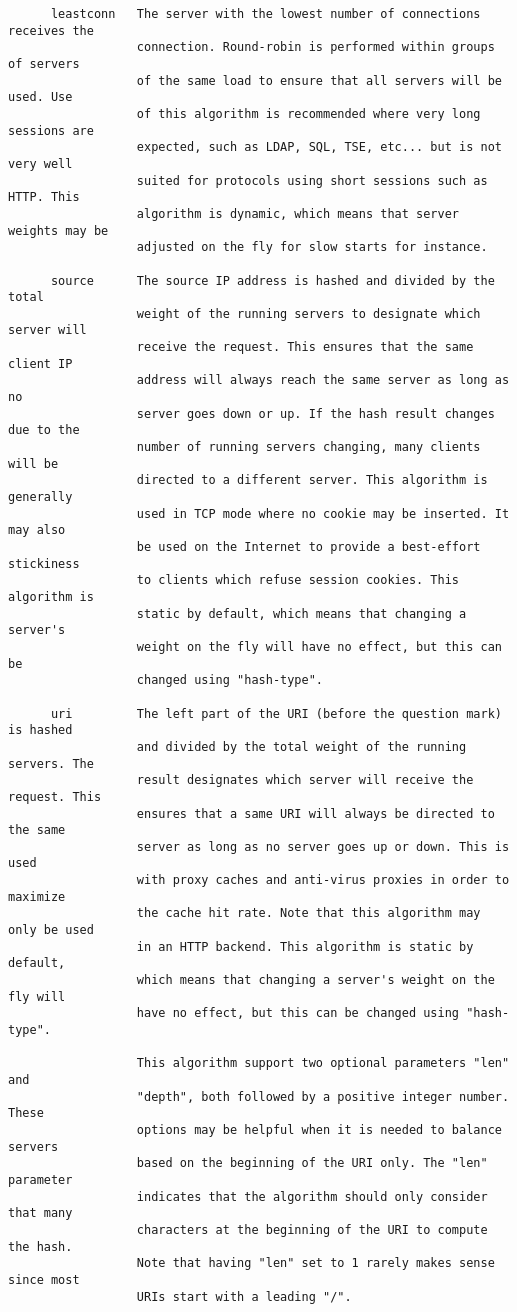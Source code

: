 \begin{verbatim}
      leastconn   The server with the lowest number of connections receives the
                  connection. Round-robin is performed within groups of servers
                  of the same load to ensure that all servers will be used. Use
                  of this algorithm is recommended where very long sessions are
                  expected, such as LDAP, SQL, TSE, etc... but is not very well
                  suited for protocols using short sessions such as HTTP. This
                  algorithm is dynamic, which means that server weights may be
                  adjusted on the fly for slow starts for instance.

      source      The source IP address is hashed and divided by the total
                  weight of the running servers to designate which server will
                  receive the request. This ensures that the same client IP
                  address will always reach the same server as long as no
                  server goes down or up. If the hash result changes due to the
                  number of running servers changing, many clients will be
                  directed to a different server. This algorithm is generally
                  used in TCP mode where no cookie may be inserted. It may also
                  be used on the Internet to provide a best-effort stickiness
                  to clients which refuse session cookies. This algorithm is
                  static by default, which means that changing a server's
                  weight on the fly will have no effect, but this can be
                  changed using "hash-type".

      uri         The left part of the URI (before the question mark) is hashed
                  and divided by the total weight of the running servers. The
                  result designates which server will receive the request. This
                  ensures that a same URI will always be directed to the same
                  server as long as no server goes up or down. This is used
                  with proxy caches and anti-virus proxies in order to maximize
                  the cache hit rate. Note that this algorithm may only be used
                  in an HTTP backend. This algorithm is static by default,
                  which means that changing a server's weight on the fly will
                  have no effect, but this can be changed using "hash-type".

                  This algorithm support two optional parameters "len" and
                  "depth", both followed by a positive integer number. These
                  options may be helpful when it is needed to balance servers
                  based on the beginning of the URI only. The "len" parameter
                  indicates that the algorithm should only consider that many
                  characters at the beginning of the URI to compute the hash.
                  Note that having "len" set to 1 rarely makes sense since most
                  URIs start with a leading "/".


\end{verbatim}
